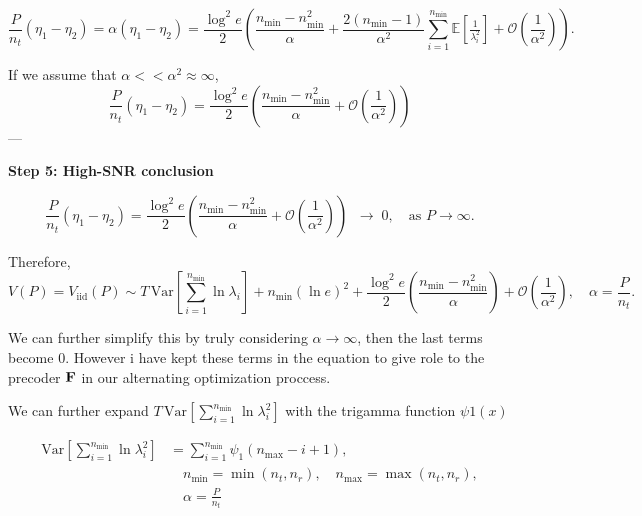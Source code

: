 \documentclass[a4paper, 12pt, onecolumn, journal, twoside, draftclsnofoot]{IEEEtran}
\begin{document}
\begin{equation*}
\frac{P}{n_t}(\eta_1-\eta_2) = \alpha(\eta_1-\eta_2)
= \frac{\log^2 e}{2}\left(
\frac{n_{\min}-n_{\min}^2}{\alpha} 
+ \frac{2(n_{\min}-1)}{\alpha^2}\sum_{i=1}^{n_{\min}}\mathbb{E}\!\left[\tfrac{1}{\lambda_i^2}\right]
+ \mathcal{O}\!\left(\frac{1}{\alpha^2}\right)\right).
\end{equation*}

If we assume that $\alpha << \alpha^2 \approx \infty$,
\begin{equation*}
 \frac{P}{n_t}(\eta_1-\eta_2)  = \frac{\log^2 e}{2}\left(
\frac{n_{\min}-n_{\min}^2}{\alpha} 
+ \mathcal{O}\!\left(\frac{1}{\alpha^2}\right)\right)
\end{equation*}
---

\newpage 
\textbf{Step 5: High-SNR conclusion}

\begin{equation*}
 \frac{P}{n_t}(\eta_1-\eta_2)  = \frac{\log^2 e}{2}\left(
\frac{n_{\min}-n_{\min}^2}{\alpha} 
+ \mathcal{O}\!\left(\frac{1}{\alpha^2}\right)\right)  \;\;\longrightarrow\; 0,
\quad \text{as } P \to \infty.
\end{equation*}



Therefore,
\begin{equation*}
V(P) = V_{\mathrm{iid}}(P) \sim 
T\,\mathrm{Var}\!\left[\sum_{i=1}^{n_{\min}}\ln \lambda_i\right]
+ n_{\min}(\ln e)^2
+ \frac{\log^2 e}{2}\left(\frac{n_{\min}-n_{\min}^2}{\alpha}\right)
+ \mathcal{O}\!\left(\frac{1}{\alpha^2}\right), 
\quad \alpha=\frac{P}{n_t}.
\end{equation*}

We can further simplify this by truly considering $\alpha \to \infty$, then the last terms become $0$. However i have kept these terms in the equation to give role to the precoder ${\bf F}$ in our alternating optimization proccess.

We can further expand $T\,\mathrm{Var}\!\left[\sum_{i=1}^{n_{\min}}\ln \lambda_i^2\right]$ with the trigamma function $\psi1(x)$

\begin{equation*}
\begin{aligned}
\mathrm{Var}\!\left[\sum_{i=1}^{n_{\min}}\ln \lambda_i^2\right] 
&= \sum_{i=1}^{n_{\min}} \psi_1(n_{\max}-i+1),\\
&\quad n_{\min} = \min(n_t,n_r), \quad n_{\max} = \max(n_t,n_r),\\
&\quad \alpha = \frac{P}{n_t}
\end{aligned}
\end{equation*}
\end{document}
